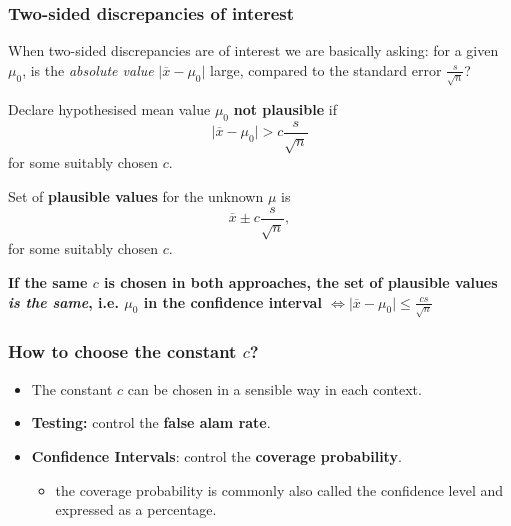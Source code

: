 \documentclass[a4paper]{article}\usepackage[]{graphicx}\usepackage[]{xcolor}
\begin{document}
\subsubsection{Two-sided discrepancies of interest}
When two-sided discrepancies are of interest we are basically asking: for a given \( \mu_0 \), is the \textit{absolute value} \( \lvert \overline{x} - \mu_0  \rvert \) large, compared to the standard error \( \frac{s}{\sqrt{n}} \)?
\begin{tcbraster}[raster columns = 2, raster halign = center, raster equal height=rows, enhanced, sharp corners, colback=white, coltitle=black, colbacktitle=myblue!25, sharpish corners, fonttitle=\bfseries, boxrule=0pt, borderline west={2pt}{0pt}{myblue}]
	\begin{tcolorbox}[title=\( t \)-test Approach]
		Declare hypothesised mean value \( \mu_0 \) \textbf{not plausible} if
		\[
			\lvert \overline{x} - \mu_0 \rvert > c \frac{s}{\sqrt{n}}
		\]
		for some suitably chosen \( c \).
	\end{tcolorbox}
	\begin{tcolorbox}[title=Confidence Interval Approach]
		Set of \textbf{plausible values} for the unknown \( \mu \) is
		\[
			\overline{x} \pm c \frac{s}{\sqrt{n}},
		\]
		for some suitably chosen \( c \).
	\end{tcolorbox}
	\begin{goldbox}
		\textbf{If the same \( c \) is chosen in both approaches, the set of plausible values \textit{is the same}, i.e. \( \mu_0 \) in the confidence interval \( \Leftrightarrow \lvert \overline{x} - \mu_0 \rvert \leq \frac{cs}{\sqrt{n}} \) }
	\end{goldbox}
\end{tcbraster}
\subsubsection{How to choose the constant \( c \)?}
\begin{itemize}
	\item The constant \( c \) can be chosen in a sensible way in each context.
	\item \textcolor{mygreen}{\textbf{Testing:}} control the \textcolor{mygreen}{\textbf{false alam rate}}.
	\item \textcolor{myred}{\textbf{Confidence Intervals}}: control the \textcolor{myred}{\textbf{coverage probability}}.
	\begin{itemize}
		\item the coverage probability is commonly also called the confidence level and expressed as a percentage.
	\end{itemize}
\end{itemize}
\end{document}
